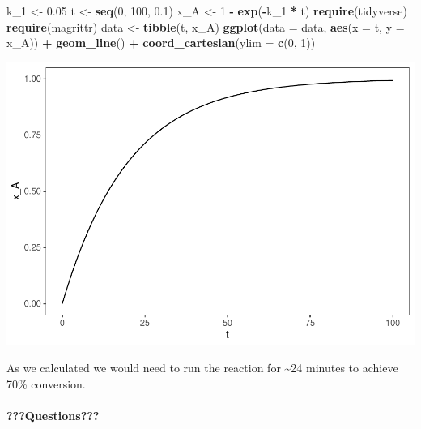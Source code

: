 \documentclass[
]{article}
\newenvironment{Shaded}{\begin{snugshade}}{\end{snugshade}}
\newcommand{\AttributeTok}[1]{\textcolor[rgb]{0.13,0.29,0.53}{#1}}
\newcommand{\DecValTok}[1]{\textcolor[rgb]{0.00,0.00,0.81}{#1}}
\newcommand{\FloatTok}[1]{\textcolor[rgb]{0.00,0.00,0.81}{#1}}
\newcommand{\FunctionTok}[1]{\textcolor[rgb]{0.13,0.29,0.53}{\textbf{#1}}}
\newcommand{\NormalTok}[1]{#1}
\newcommand{\OtherTok}[1]{\textcolor[rgb]{0.56,0.35,0.01}{#1}}
\newcommand{\SpecialCharTok}[1]{\textcolor[rgb]{0.81,0.36,0.00}{\textbf{#1}}}
\begin{document}
\begin{Shaded}
\begin{Highlighting}[]
\NormalTok{k\_1 }\OtherTok{\textless{}{-}} \FloatTok{0.05}
\NormalTok{t }\OtherTok{\textless{}{-}} \FunctionTok{seq}\NormalTok{(}\DecValTok{0}\NormalTok{, }\DecValTok{100}\NormalTok{, }\FloatTok{0.1}\NormalTok{)}
\NormalTok{x\_A }\OtherTok{\textless{}{-}} \DecValTok{1} \SpecialCharTok{{-}} \FunctionTok{exp}\NormalTok{(}\SpecialCharTok{{-}}\NormalTok{k\_1 }\SpecialCharTok{*}\NormalTok{ t)}
\FunctionTok{require}\NormalTok{(tidyverse)}
\FunctionTok{require}\NormalTok{(magrittr)}
\NormalTok{data }\OtherTok{\textless{}{-}} \FunctionTok{tibble}\NormalTok{(t, x\_A)}
\FunctionTok{ggplot}\NormalTok{(}\AttributeTok{data =}\NormalTok{ data, }\FunctionTok{aes}\NormalTok{(}\AttributeTok{x =}\NormalTok{ t, }\AttributeTok{y =}\NormalTok{ x\_A)) }\SpecialCharTok{+} \FunctionTok{geom\_line}\NormalTok{() }\SpecialCharTok{+}
    \FunctionTok{coord\_cartesian}\NormalTok{(}\AttributeTok{ylim =} \FunctionTok{c}\NormalTok{(}\DecValTok{0}\NormalTok{, }\DecValTok{1}\NormalTok{))}
\end{Highlighting}
\end{Shaded}

\includegraphics{Bioprocess_Engineering_files/figure-latex/unnamed-chunk-8-1.pdf}

As we calculated we would need to run the reaction for \textasciitilde24 minutes to achieve 70\% conversion.

\hypertarget{questions-3}{%
\paragraph{???Questions???}\label{questions-3}}
\end{document}
